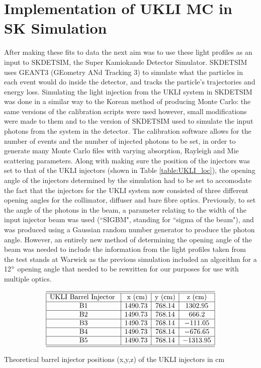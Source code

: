 \section{Implementation of UKLI MC in SK Simulation}
After making these fits to data the next aim was to use these light profiles as an input to SKDETSIM, the Super Kamiokande Detector Simulator. SKDETSIM uses GEANT3 (GEometry ANd Tracking 3) to simulate what the particles in each event would do inside the detector, and tracks the particle's trajectories and energy loss. Simulating the light injection from the UKLI system in SKDETSIM was done in a similar way to the Korean method of producing Monte Carlo: the same versions of the calibration scripts were used however, small modifications were made to them and to the version of SKDETSIM used to simulate the input photons from the system in the detector. The calibration software allows for the number of events and the number of injected photons to be set, in order to generate many Monte Carlo files with varying absorption, Rayleigh and Mie scattering parameters. 
\newline
Along with making sure the position of the injectors was set to that of the UKLI injectors (shown in Table \ref{table:UKLI_loc}), the opening angle of the injectors determined by the simulation had to be set to accomodate the fact that the injectors for the UKLI system now consisted of three different opening angles for the collimator, diffuser and bare fibre optics. Previously, to set the angle of the photons in the beam, a parameter relating to the width of the input injector beam was used (``SIGBM", standing for ``sigma of the beam"), and was produced using a Gaussian random number generator to produce the photon angle. However, an entirely new method of determining the opening angle of the beam was needed to include the information from the light profiles taken from the test stands at Warwick as the previous simulation included an algorithm for a 12$\degree$ opening angle that needed to be rewritten for our purposes for use with multiple optics. 

\begin{table}[htp]
    $$
\begin{array}{|c|c|c|c|c|c|}  
    \hline \hline{\text {UKLI Barrel Injector }} & {\text { x (cm)}} & {\text {y (cm)}} & {\text {z (cm)}}  \tabularnewline
    \hline \text { B1 } & 1490.73 & 768.14 & 1302.95 \\
    \hline \text { B2 } & 1490.73 & 768.14 & 666.2 \\
    \hline \text { B3 } & 1490.73 & 768.14 & -111.05 \\
    \hline \text { B4 } & 1490.73 & 768.14 & -676.65 \\
    \hline \text { B5 } & 1490.73 & 768.14 &  -1313.95 \\
    \hline \hline 
\end{array}
    $$
\caption{Theoretical barrel injector positions (x,y,z) of the UKLI injectors in cm} 
\label{table:UKLI_loc}
\end{table}

